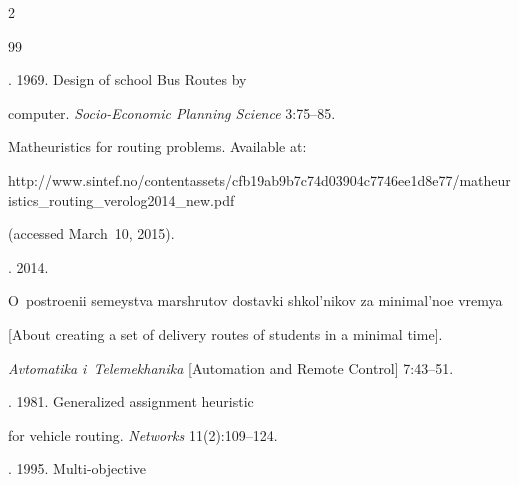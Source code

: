   \begin{multicols}{2}



\renewcommand{\bibname}{\protect\rmfamily References}








{\small\frenchspacing

 {%


 \begin{thebibliography}{99}



 \vspace*{-2pt}




. 1969. Design of school Bus Routes by

computer. \textit{Socio-Economic Planning Science} 3:75--85.


 Matheuristics for routing problems. Available at: {\sf

http://www.sintef.no/contentassets/cfb19ab9\linebreak b7c74d03904c7746ee1d8e77/matheuristics\_routing\_\linebreak verolog2014\_new.pdf} (accessed March~10, 2015).


. 2014.

O~postroenii semeystva marshrutov dostavki shkol'nikov za minimal'noe vremya

[About creating a set of delivery routes of students in a minimal time].

\textit{Avtomatika i~Telemekhanika} [Automation and Remote Control] 7:43--51.


. 1981. Generalized assignment heuristic

for vehicle routing. \textit{Networks} 11(2):109--124.


. 1995. Multi-objective


\end{thebibliography}}}
\end{multicols}
